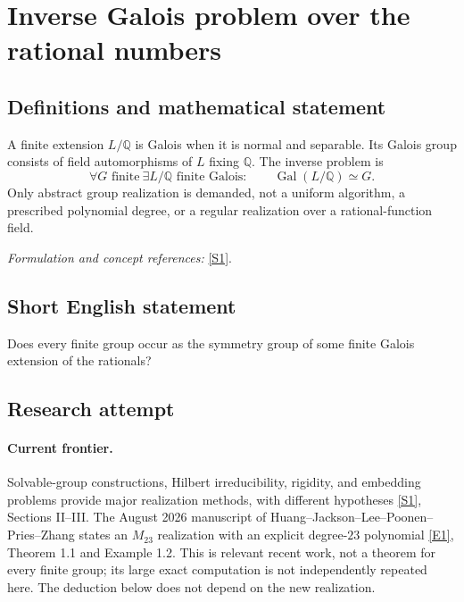 \documentclass[11pt,a4paper]{article}
\newcommand{\Q}{\mathbb{Q}}
\newcommand{\sref}[2]{\hyperlink{source:#1:#2}{[S#2]}}
\newcommand{\eref}[2]{\hyperlink{extra:#1:#2}{[E#2]}}
\newif\ifshowcatalogue
\newcommand{\cataloguescope}[1]{\ifshowcatalogue
 \paragraph{Exact scope in the supplied catalogue.}
 \begin{quote}\small #1\end{quote}\fi}
\numberwithin{equation}{section}
\begin{document}
\setcounter{section}{60}
\clearpage
\section{\texorpdfstring{Inverse Galois problem over the rational numbers}{Inverse Galois problem over the rational numbers}}\label{61}
\subsection{Definitions and mathematical statement}
A finite extension $L/\Q$ is Galois when it is normal and separable. Its Galois group consists of field automorphisms of $L$ fixing $\Q$. The inverse problem is
\[
 \forall G\text{ finite}\ \exists L/\Q\text{ finite Galois}:\qquad
 \operatorname{Gal}(L/\Q)\simeq G.
\]
Only abstract group realization is demanded, not a uniform algorithm, a prescribed polynomial degree, or a regular realization over a rational-function field.
\par\smallskip\textit{Formulation and concept references:} \sref{61}{1}.
\cataloguescope{Prove or disprove that every finite group G is isomorphic to the Galois group Gal(L/Q) of some finite Galois extension L of the rational numbers Q.}
\subsection{Short English statement}
Does every finite group occur as the symmetry group of some finite Galois extension of the rationals?
\subsection{Research attempt}

\paragraph{Current frontier.}
Solvable-group constructions, Hilbert irreducibility, rigidity, and embedding problems provide major realization methods, with different hypotheses \sref{61}{1}, Sections II--III. The August 2026 manuscript of Huang--Jackson--Lee--Poonen--Pries--Zhang states an $M_{23}$ realization with an explicit degree-$23$ polynomial \eref{61}{1}, Theorem 1.1 and Example 1.2. This is relevant recent work, not a theorem for every finite group; its large exact computation is not independently repeated here. The deduction below does not depend on the new realization.
\end{document}
